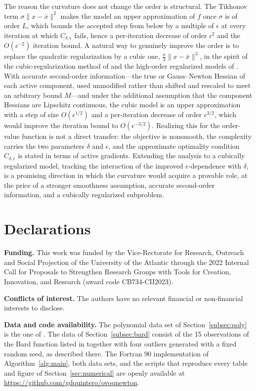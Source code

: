 \documentclass[11pt]{article}
\newcounter{alg}[section]
\begin{document}
The reason the curvature does not change the order is structural. The Tikhonov
term $\sigma\|x - \bar x\|^2$ makes the model an upper approximation of $f$ once
$\sigma$ is of order $L$, which bounds the accepted step from below by a
multiple of $\epsilon$ at every iteration at which $C_{\delta,\epsilon}$ fails,
hence a per-iteration decrease of order $\epsilon^2$ and the $O(\epsilon^{-2})$
iteration bound. A natural way to
genuinely improve the order is to replace the quadratic regularization by a
cubic one, $\tfrac{\sigma}{3}\|x - \bar x\|^3$, in the spirit of the
cubic-regularization method of \cite{nesterov} and the high-order regularized
models of \cite{bgmst1, bgms}. With accurate second-order information---the true
or Gauss--Newton Hessian of each active component, used unmodified rather than
shifted and rescaled to meet an arbitrary bound $M$---and under the additional
assumption that the component Hessians are
Lipschitz continuous, the cubic model is an upper approximation with a step of
size $O(\epsilon^{1/2})$ and a per-iteration decrease of order $\epsilon^{3/2}$,
which would improve the iteration bound to $O(\epsilon^{-3/2})$. Realizing this
for the order-value function is not a direct transfer: the objective is
nonsmooth, the complexity carries the two parameters $\delta$ and $\epsilon$, and
the approximate optimality condition $C_{\delta,\epsilon}$ is stated in terms of
active gradients. Extending the analysis to a cubically regularized model,
tracking the interaction of the improved $\epsilon$-dependence with $\delta$, is
a promising direction in which the curvature would acquire a provable role, at
the price of a stronger smoothness assumption, accurate second-order information,
and a cubically regularized subproblem.

\section*{Declarations}

\medskip
\noindent
\textbf{Funding.} This work was funded by the Vice-Rectorate for Research, Outreach and Social Projection of the University of the Atlantic through the 2022 Internal Call for Proposals to Strengthen Research Groups with Tools for Creation, Innovation, and Research (award code CB734-CII2023).

\medskip
\noindent
\textbf{Conflicts of interest.} The authors have no relevant financial or non-financial interests to disclose.

\medskip
\noindent
\textbf{Data and code availability.} The polynomial data set of Section~\ref{subsec:poly} is the one of \cite{dunder1}. The data of Section~\ref{subsec:bard} consist of the 15 observations of the Bard function listed in \cite{mgh} together with four outliers generated with a fixed random seed, as described there. The Fortran 90 implementation of Algorithm~\ref{alg:main}, both data sets, and the scripts that reproduce every table and figure of Section~\ref{sec:numerical} are openly available at \url{https://github.com/gdquintero/ovoqnewton}.
\end{document}
